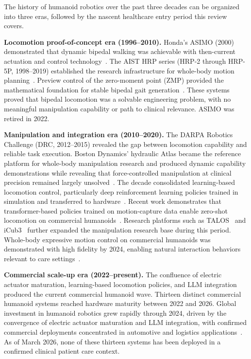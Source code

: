 The history of humanoid robotics over the past three decades can be organized
into three eras, followed by the nascent healthcare entry period this review
covers.

\textbf{Locomotion proof-of-concept era (1996--2010).} Honda's ASIMO (2000)
demonstrated that dynamic bipedal walking was achievable with then-current
actuation and control technology~\cite{sakagami2002asimo,cao2025humanoid}. The
AIST HRP series (HRP-2 through HRP-5P, 1998--2019) established the research
infrastructure for whole-body motion planning~\cite{kaneko2019hrp5p}. Preview
control of the zero-moment point (ZMP) provided the mathematical foundation for
stable bipedal gait generation~\cite{kajita2003biped}. These systems proved that bipedal locomotion was a
solvable engineering problem, with no meaningful manipulation capability or path
to clinical relevance. ASIMO was retired in 2022.

\textbf{Manipulation and integration era (2010--2020).} The DARPA Robotics
Challenge (DRC, 2012--2015) revealed the gap between locomotion capability and
reliable task execution. Boston Dynamics' hydraulic Atlas became the reference
platform for whole-body manipulation research and produced dynamic capability
demonstrations while revealing that force-controlled manipulation at clinical
precision remained largely unsolved~\cite{cao2025humanoid}. The decade
consolidated learning-based locomotion control, particularly deep reinforcement
learning policies trained in simulation and transferred to
hardware~\cite{duan2022simtoreal,radosavovic2024realworld}. Recent work
demonstrates that transformer-based policies trained on motion-capture data
enable zero-shot locomotion on commercial
humanoids~\cite{radosavovic2024humanoid}. Research platforms such as
TALOS~\cite{stasse2017talos} and iCub3~\cite{dafarra2024icub3} further expanded
the manipulation research base during this period.
Whole-body expressive motion control on commercial humanoids was demonstrated with high fidelity by 2024, enabling
natural interaction behaviors relevant to care
settings~\cite{cheng2024expressive}.

\textbf{Commercial scale-up era (2022--present).} The confluence of electric
actuator maturation, learning-based locomotion policies, and LLM integration
produced the current commercial humanoid wave. Thirteen distinct commercial
humanoid systems reached hardware maturity between 2022 and 2026. Global
investment in humanoid robotics grew rapidly through 2024, driven by the
convergence of electric actuator maturation and LLM integration, with confirmed
commercial deployments concentrated in automotive and logistics
applications~\cite{goldmansachs2024humanoid,ifr2025humanoid}.
As
of March 2026, none of these thirteen systems has been deployed in a confirmed
clinical patient care context.

